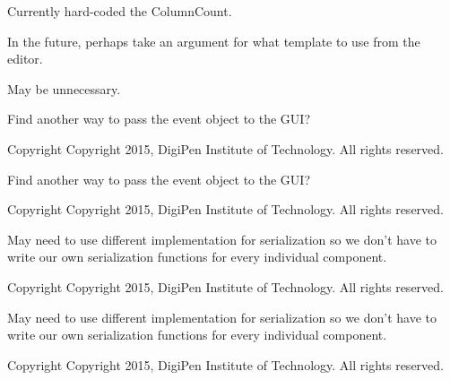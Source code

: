 \begin{DoxyRefList}
\item[\label{todo__todo000039}%
\hypertarget{todo__todo000039}{}%
Member \hyperlink{classDCEngine_1_1Systems_1_1GraphicsGL_a05cb70091e1c5038a24c5abe887239d3}{D\-C\-Engine\-:\-:Systems\-:\-:Graphics\-G\-L\-:\-:Animation\-Update} (Components\-::\-Sprite \&sprite, float dt)]Currently hard-\/coded the Column\-Count.  
\item[\label{todo__todo000012}%
\hypertarget{todo__todo000012}{}%
Member \hyperlink{classDCEngine_1_1ZilchScript_a50442417ca9814ed60d4935b92d17951}{D\-C\-Engine\-:\-:Zilch\-Script\-:\-:Build\-Default\-From\-Template} ()]In the future, perhaps take an argument for what template to use from the editor.  
\item[\label{todo__todo000013}%
\hypertarget{todo__todo000013}{}%
Member \hyperlink{classDCEngine_1_1ZilchScript_a7d939b8e5652a98ea0f593a1a6c136e8}{D\-C\-Engine\-:\-:Zilch\-Script\-:\-:Include\-Script} ()]May be unnecessary.  
\item[\label{todo__todo000044}%
\hypertarget{todo__todo000044}{}%
File \hyperlink{Input_8cpp}{Input.cpp} ]Find another way to pass the event object to the G\-U\-I? \begin{DoxyCopyright}{Copyright}
Copyright 2015, Digi\-Pen Institute of Technology. All rights reserved.  
\end{DoxyCopyright}

\item[\label{todo__todo000045}%
\hypertarget{todo__todo000045}{}%
File \hyperlink{Input_8h}{Input.h} ]Find another way to pass the event object to the G\-U\-I? \begin{DoxyCopyright}{Copyright}
Copyright 2015, Digi\-Pen Institute of Technology. All rights reserved.  
\end{DoxyCopyright}

\item[\label{todo__todo000049}%
\hypertarget{todo__todo000049}{}%
File \hyperlink{Serialization_8cpp}{Serialization.cpp} ]May need to use different implementation for serialization so we don't have to write our own serialization functions for every individual component. \begin{DoxyCopyright}{Copyright}
Copyright 2015, Digi\-Pen Institute of Technology. All rights reserved.  
\end{DoxyCopyright}

\item[\label{todo__todo000050}%
\hypertarget{todo__todo000050}{}%
File \hyperlink{Serialization_8h}{Serialization.h} ]May need to use different implementation for serialization so we don't have to write our own serialization functions for every individual component. \begin{DoxyCopyright}{Copyright}
Copyright 2015, Digi\-Pen Institute of Technology. All rights reserved.  
\end{DoxyCopyright}


\end{DoxyRefList}

